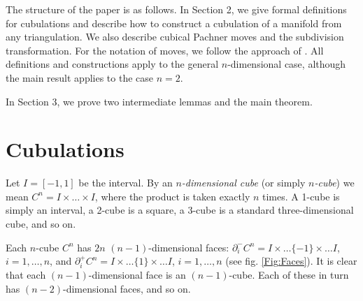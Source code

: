 \documentclass{amsart}
\begin{document}
The structure of the paper is as follows. In Section 2, we give formal definitions for cubulations and describe how to construct a cubulation of a manifold from any triangulation. We also describe cubical Pachner moves and the subdivision transformation. For the notation of moves, we follow the approach of \cite{BEE}. All definitions and constructions apply to the general $n$-dimensional case, although the main result applies to the case $n = 2$.

In Section 3, we prove two intermediate lemmas and the main theorem.


\section{Cubulations}

Let $I = [-1, 1]$ be the interval. By an \emph{$n$-dimensional cube} (or simply \emph{$n$-cube}) we mean $C^n = I\times\ldots\times I$, where the product is taken exactly $n$ times. A 1-cube is simply an interval, a 2-cube is a square, a 3-cube is a standard three-dimensional cube, and so on.

Each $n$-cube $C^n$ has $2n$ $(n - 1)$-dimensional faces: $\partial_i^{-} C^n = I\times \ldots \{-1\}\times\ldots I$, $i = 1, \ldots, n$, and $\partial_i^{+} C^n = I\times \ldots \{1\}\times\ldots I$, $i = 1, \ldots, n$ (see fig. \ref{Fig:Faces}). It is clear that each $(n - 1)$-dimensional face is an $(n - 1)$-cube. Each of these in turn has $(n - 2)$-dimensional faces, and so on.
\end{document}
